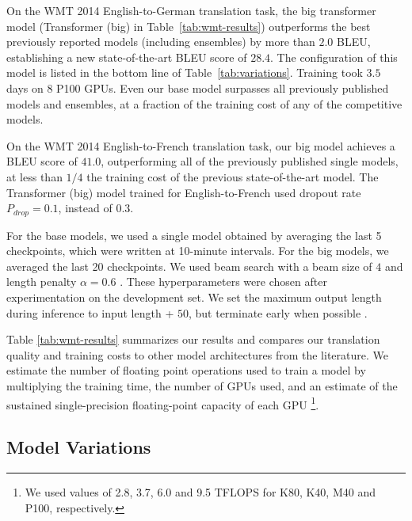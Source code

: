 On the WMT 2014 English-to-German translation task, the big transformer model (Transformer (big) in Table~\ref{tab:wmt-results}) outperforms the best previously reported models (including ensembles) by more than $2.0$ BLEU, establishing a new state-of-the-art BLEU score of $28.4$.  The configuration of this model is listed in the bottom line of Table~\ref{tab:variations}.  Training took $3.5$ days on $8$ P100 GPUs.  Even our base model surpasses all previously published models and ensembles, at a fraction of the training cost of any of the competitive models.

On the WMT 2014 English-to-French translation task, our big model achieves a BLEU score of $41.0$, outperforming all of the previously published single models, at less than $1/4$ the training cost of the previous state-of-the-art model. The Transformer (big) model trained for English-to-French used dropout rate $P_{drop}=0.1$, instead of $0.3$.

For the base models, we used a single model obtained by averaging the last 5 checkpoints, which were written at 10-minute intervals.  For the big models, we averaged the last 20 checkpoints. We used beam search with a beam size of $4$ and length penalty $\alpha=0.6$ \citep{wu2016google}.  These hyperparameters were chosen after experimentation on the development set.  We set the maximum output length during inference to input length + $50$, but terminate early when possible \citep{wu2016google}.

Table \ref{tab:wmt-results} summarizes our results and compares our translation quality and training costs to other model architectures from the literature.  We estimate the number of floating point operations used to train a model by multiplying the training time, the number of GPUs used, and an estimate of the sustained single-precision floating-point capacity of each GPU \footnote{We used values of 2.8, 3.7, 6.0 and 9.5 TFLOPS for K80, K40, M40 and P100, respectively.}.

\subsection{Model Variations}


